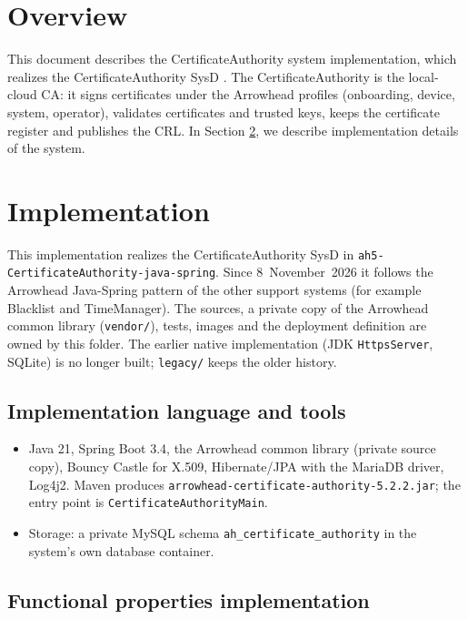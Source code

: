 \documentclass[a4paper]{arrowhead}
\begin{document}
\section{Overview}
\label{sec:overview}

This document describes the CertificateAuthority system implementation, which realizes the CertificateAuthority SysD \cite{cau-sysd}. The Certificate\allowbreak{}Authority is the local-cloud CA: it signs certificates under the Arrowhead profiles (onboarding, device, system, operator), validates certificates and trusted keys, keeps the certificate register and publishes the CRL.
In Section \ref{Implementation}, we describe implementation details of the system.

\newpage

\section{Implementation}
\label{Implementation}

This implementation realizes the CertificateAuthority SysD in \texttt{ah5-\allowbreak{}CertificateAuthority-\allowbreak{}java-\allowbreak{}spring}. Since 8~November~2026 it follows the Arrowhead Java-Spring pattern of the other support systems (for example Blacklist and TimeManager). The sources, a private copy of the Arrowhead common library (\texttt{vendor/}), tests, images and the deployment definition are owned by this folder. The earlier native implementation (JDK \texttt{HttpsServer}, SQLite) is no longer built; \texttt{legacy/} keeps the older history.

\subsection{Implementation language and tools}
\begin{itemize}
\item Java 21, Spring Boot 3.4, the Arrowhead common library (private source copy), Bouncy Castle for X.509, Hibernate/JPA with the MariaDB driver, Log4j2. Maven produces \texttt{arrowhead-\allowbreak{}certificate-\allowbreak{}authority-\allowbreak{}5.2.2.jar}; the entry point is \texttt{Certificate\allowbreak{}Authority\allowbreak{}Main}.
\item Storage: a private MySQL schema \texttt{ah\_\allowbreak{}certificate\_\allowbreak{}authority} in the system's own database container.
\end{itemize}

\subsection{Functional properties implementation}
\end{document}
